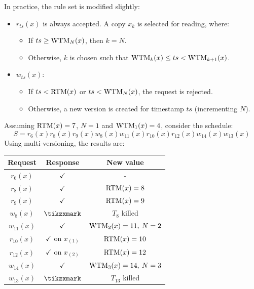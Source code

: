 In practice, the rule set is modified slightly:
\begin{itemize}
    \item $r_{ts}(x)$ is always accepted. A copy $x_k$ is selected for reading, where:
        \begin{itemize}
            \item If $ts \geq \textnormal{WTM}_N(x)$, then $k=N$. 
            \item  Otherwise, $k$ is chosen such that $\textnormal{WTM}_k(x) \leq ts < \textnormal{WTM}_{k+1}(x)$. 
        \end{itemize}
    \item $w_{ts}(x)$:
        \begin{itemize}
            \item If $ts < \textnormal{RTM}(x)$ or $ts < \textnormal{WTM}_N(x)$, the request is rejected. 
            \item  Otherwise, a new version is created for timestamp $ts$ (incrementing $N$).
        \end{itemize}
\end{itemize}
\begin{example}
    Assuming $\textnormal{RTM}(x)=7$, $N=1$ and $\textnormal{WTM}_1(x)=4$, consider the schedule:
    \[S=r_6(x) r_8(x) r_9(x) w_8(x) w_{11}(x) r_{10}(x) r_{12}(x) w_{14}(x) w_{13}(x)\]
    Using multi-versioning, the results are:
    \begin{table}[H]
        \centering
        \begin{tabular}{ccc}
        \textbf{Request} & \textbf{Response}         & \textbf{New value}  \\ \hline
        $r_6(x)$         & $\checkmark$              & -                   \\
        $r_8(x)$         & $\checkmark$              & $\textnormal{RTM}(x)=8$          \\
        $r_9(x)$         & $\checkmark$              & $\textnormal{RTM}(x)=9$          \\
        $w_8(x)$         & $\tikzxmark$              & $T_8$ killed        \\
        $w_{11}(x)$      & $\checkmark$              & $\textnormal{WTM}_2(x)=11,\:N=2$ \\
        $r_{10}(x)$      & $\checkmark$ on $x_{(1)}$ & $\textnormal{RTM}(x)=10$         \\
        $r_{12}(x)$      & $\checkmark$ on $x_{(2)}$ & $\textnormal{RTM}(x)=12$         \\
        $w_{14}(x)$      & $\checkmark$              & $\textnormal{WTM}_3(x)=14,\:N=3$ \\
        $w_{13}(x)$      & $\tikzxmark$              & $T_{13}$ killed
        \end{tabular}
    \end{table}
\end{example}

